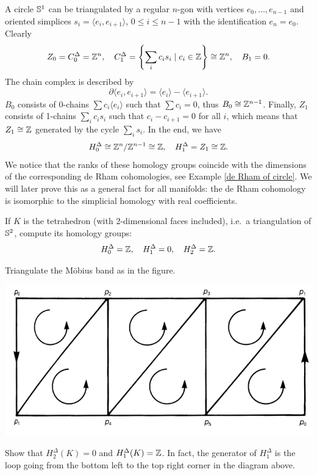 \begin{example}
    A circle $\mathbb{S}^1$ can be triangulated by a regular $n$-gon with vertices  $e_0,\ldots,e_{n-1}$ and oriented simplices $s_i=\langle e_i,e_{i+1}\rangle$, $0\leq i\leq n-1$ with the identification $e_n=e_0$. 
    Clearly 
    \[Z_0=C^\Delta_0=\mathbb{Z}^n,\quad C^\Delta_1=\left\{\sum_i c_i s_i \mid c_i\in \mathbb{Z}\right\}\cong \mathbb{Z}^n,\quad B_1=0.\]
    The chain complex is described by 
    \[\partial\langle e_i,e_{i+1}\rangle=\langle e_i\rangle-\langle e_{i+1}\rangle .\]
    $B_0$ consists of 0-chains $\sum c_i \langle e_i\rangle$ such that $\sum c_i=0$, thus $B_0\cong \mathbb{Z}^{n-1}$.
    Finally, $Z_1$ consists of 1-chains $\sum_i c_i s_i$ such that $c_i-c_{i+1}=0$ for all $i$, which means that $Z_1\cong \mathbb{Z}$ generated by the cycle $\sum_i s_i$. In the end, we have
    \[H^\Delta_0\cong \mathbb{Z}^n/\mathbb{Z}^{n-1}\cong \mathbb{Z},\quad H^\Delta_1=Z_1\cong \mathbb{Z}. \]
    We notice that the ranks of these homology groups coincide with the dimensions of the corresponding de Rham cohomologies, see Example \ref{de Rham of circle}. We will later prove this as a general fact for all manifolds: the de Rham cohomology is isomorphic to the simplicial homology with real coefficients.
\end{example}


\begin{xca}
    If $K$ is the tetrahedron (with 2-dimensional faces included), i.e.\ a triangulation of $\mathbb{S}^2$, compute its homology groups:
    \[H^\Delta_0=\mathbb{Z},\quad H^\Delta_1=0,\quad H^\Delta_2=\mathbb{Z}.\]
\end{xca}
\begin{xca}
    Triangulate the M\"obius band as in the figure.
    \begin{center}
        \includegraphics[scale=0.2]{figures/mobius.png}
    \end{center}
    Show that $H^\Delta_2(K)=0$ and $H^\Delta_1(K)=\mathbb{Z}$. In fact, the generator of $H^\Delta_1$ is the loop going from the bottom left to the top right corner in the diagram above.
\end{xca}

